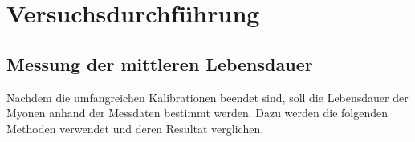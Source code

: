 \section{Versuchsdurchführung}




\subsection{Messung der mittleren Lebensdauer}
Nachdem die umfangreichen Kalibrationen beendet sind, soll die Lebensdauer der Myonen anhand der Messdaten bestimmt werden. Dazu werden die folgenden Methoden verwendet und deren Resultat verglichen.


